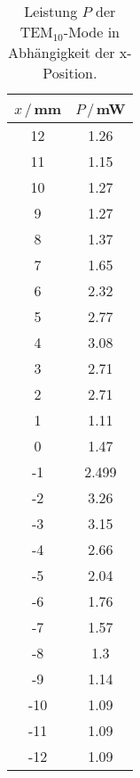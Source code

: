 \begin{table}[H]
    \center
    \caption{Leistung $P$ der TEM$_{10}$-Mode in Abhängigkeit der x-Position.}
    \begin{tabular}{c c}
        \toprule
        $x\,/\,$mm & $P\,/\,$mW\\
        \midrule
        12&      1.26\\
        11&      1.15\\
        10&      1.27\\
        9 &      1.27\\
        8 &      1.37\\
        7 &      1.65\\
        6 &      2.32\\
        5 &      2.77\\
        4 &      3.08\\
        3 &      2.71\\
        2 &      2.71\\
        1 &      1.11\\
        0 &      1.47\\
        -1&      2.499\\
        -2&      3.26\\
        -3&      3.15\\
        -4&      2.66\\
        -5&      2.04\\
        -6&      1.76\\
        -7&      1.57\\
        -8&      1.3\\
        -9&      1.14\\
        -10&     1.09\\
        -11&     1.09\\
        -12&     1.09\\
        \bottomrule
    \end{tabular}
    \label{tab:TEM10}
\end{table}

